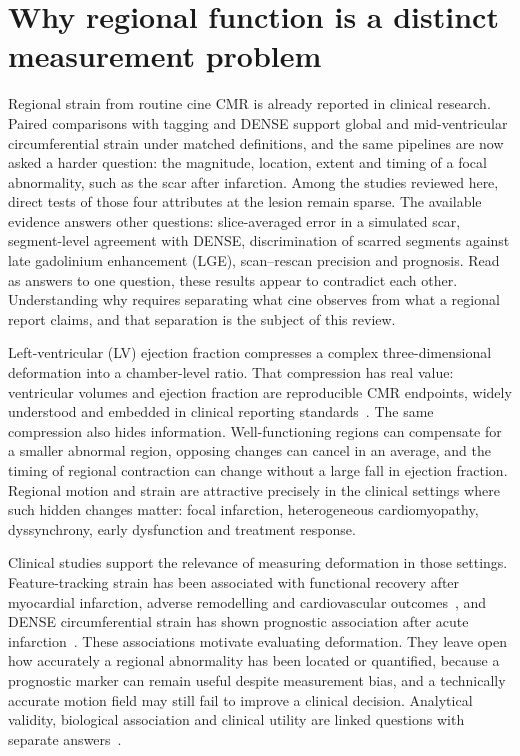 \section{Why regional function is a distinct measurement problem}

Regional strain from routine cine CMR is already reported in clinical research. Paired comparisons with tagging and DENSE support global and mid-ventricular circumferential strain under matched definitions, and the same pipelines are now asked a harder question: the magnitude, location, extent and timing of a focal abnormality, such as the scar after infarction. Among the studies reviewed here, direct tests of those four attributes at the lesion remain sparse. The available evidence answers other questions: slice-averaged error in a simulated scar, segment-level agreement with DENSE, discrimination of scarred segments against late gadolinium enhancement (LGE), scan--rescan precision and prognosis. Read as answers to one question, these results appear to contradict each other. Understanding why requires separating what cine observes from what a regional report claims, and that separation is the subject of this review.

Left-ventricular (LV) ejection fraction compresses a complex three-dimensional deformation into a chamber-level ratio. That compression has real value: ventricular volumes and ejection fraction are reproducible CMR endpoints, widely understood and embedded in clinical reporting standards~\cite{schulzmenger2020,hundley2022}. The same compression also hides information. Well-functioning regions can compensate for a smaller abnormal region, opposing changes can cancel in an average, and the timing of regional contraction can change without a large fall in ejection fraction. Regional motion and strain are attractive precisely in the clinical settings where such hidden changes matter: focal infarction, heterogeneous cardiomyopathy, dyssynchrony, early dysfunction and treatment response.

Clinical studies support the relevance of measuring deformation in those settings. Feature-tracking strain has been associated with functional recovery after myocardial infarction, adverse remodelling and cardiovascular outcomes~\cite{buss2015,reindl2021,chadalavada2024}, and DENSE circumferential strain has shown prognostic association after acute infarction~\cite{mangion2019}. These associations motivate evaluating deformation. They leave open how accurately a regional abnormality has been located or quantified, because a prognostic marker can remain useful despite measurement bias, and a technically accurate motion field may still fail to improve a clinical decision. Analytical validity, biological association and clinical utility are linked questions with separate answers~\cite{raunig2015,puntmann2018}.

